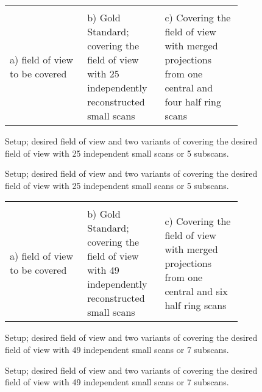 \ifiucr
	\begin{figure}%
		\centering%
		\caption{Setup; desired field of view and two variants of covering the desired field of view with 25 independent small scans or 5 subscans.}%
		\begin{tabular}{p{0.3\linewidth}p{0.3\linewidth}p{0.3\linewidth}}%
			 &%
			 &%
			\\%
			a) field of view to be covered &%
			b) Gold Standard; covering the field of view with 25 independently reconstructed small scans &%
			c) Covering the field of view with merged projections from one central and four half ring scans \\%
		\end{tabular}%
		\label{fig:Setup5SubScans}%
	\end{figure}%
\else
	\begin{figure*}[htp]
		\centering%
		\caption{Setup; desired field of view and two variants of covering the desired field of view with 25 independent small scans or 5 subscans.}%
		\label{fig:Setup5SubScans}%
	\end{figure*}
\fi

\ifiucr
	\begin{figure}%
		\centering%
		\caption{Setup; desired field of view and two variants of covering the desired field of view with 49 independent small scans or 7 subscans.}%
		\begin{tabular}{p{0.3\linewidth}p{0.3\linewidth}p{0.3\linewidth}}%
			 &%
			 &%
			 \\%
			a) field of view to be covered &%
			b) Gold Standard; covering the field of view with 49 independently reconstructed small scans &%
			c) Covering the field of view with merged projections from one central and six half ring scans \\%
		\end{tabular}%
		\label{fig:Setup7SubScans}%
	\end{figure}%
\else
	\begin{figure*}[htp]
		\centering%
		\caption{Setup; desired field of view and two variants of covering the desired field of view with 49 independent small scans or 7 subscans.}%
		\label{fig:Setup7SubScans}%
	\end{figure*}
\fi

